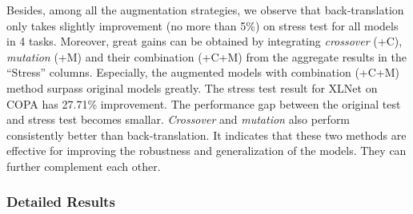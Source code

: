 Besides, among all the augmentation
strategies, we observe that 
back-translation only takes slightly improvement (no more than 5\%)
on stress test for all models in 4 tasks.
Moreover, great gains can be obtained by integrating 
\textit{crossover} (+C), \textit{mutation} (+M) and their combination (+C+M) from 
the aggregate results in the ``Stress'' columns. 
Especially, the augmented models with combination (+C+M) method surpass original 
models greatly. The stress test result for XLNet on COPA has 27.71\% improvement. 
The performance gap between the original test and stress test becomes smallar.
\textit{Crossover} and \textit{mutation} also 
perform consistently
better than back-translation. 
It indicates that these two methods 
are effective for improving the robustness and generalization of the models. 
They can further complement each other.

\label{sec:robust}




\subsubsection{Detailed Results}

